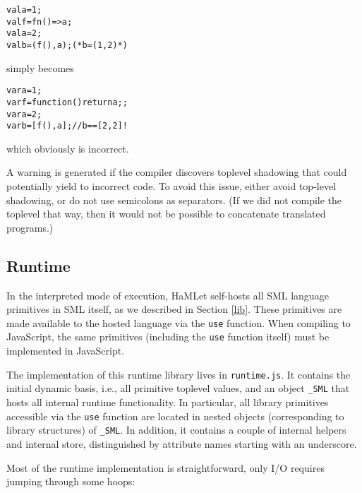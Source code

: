 \documentclass[twoside,titlepage]{article}
\begin{document}
\begin{quoting}
\begin{alltt}
val a = 1;
val f = fn() => a;
val a = 2;
val b = (f(), a);  (* b = (1, 2) *)
\end{alltt}
\end{quoting}

simply becomes

\begin{quoting}
\begin{alltt}
var a = 1;
var f = function() \textbraceleft return a; \textbraceright;
var a = 2;
var b = [f(), a];  // b == [2, 2] !
\end{alltt}
\end{quoting}

which obviously is incorrect.

A warning is generated if the compiler discovers toplevel shadowing that could potentially yield to incorrect code.  To avoid this issue, either avoid top-level shadowing, or do not use semicolons as separators.
(If we did not compile the toplevel that way, then it would not be possible to concatenate translated programs.)
  

\subsection{Runtime}
\label{javascriptruntime}

In the interpreted mode of execution, HaMLet self-hosts all SML language primitives in SML itself, as we described in Section \ref{lib}. These primitives are made available to the hosted language via the {\tt use} function.  When compiling to JavaScript, the same primitives (including the {\tt use} function itself) must be implemented in JavaScript.

The implementation of this runtime library lives in {\tt runtime.js}. It contains the initial dynamic basis, i.e., all primitive toplevel values, and an object {\tt \_SML} that hosts all internal runtime functionality. In particular, all library primitives accessible via the {\tt use} function are located in nested objects (corresponding to library structures) of {\tt \_SML}. In addition, it contains a couple of internal helpers and internal store, distinguished by attribute names starting with an underscore.

Most of the runtime implementation is straightforward, only I/O requires jumping through some hoops:
\end{document}
